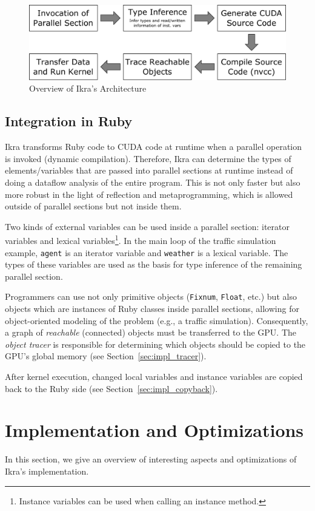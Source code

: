 \documentclass[preprint]{sigplanconf}
\begin{document}
\begin{figure}[!tp]
    \includegraphics[width=\columnwidth]{high_level_arch.pdf}
    \caption{Overview of Ikra's Architecture}
    \label{fig:overview_arch}
\end{figure}

\subsection{Integration in Ruby}
Ikra transforms Ruby code to CUDA code at runtime when a parallel operation is invoked (dynamic compilation). Therefore, Ikra can determine the types of elements/variables that are passed into parallel sections at runtime instead of doing a dataflow analysis of the entire program. This is not only faster but also more robust in the light of reflection and metaprogramming, which is allowed outside of parallel sections but not inside them.

Two kinds of external variables can be used inside a parallel section: iterator variables and lexical variables\footnote{Instance variables can be used when calling an instance method.}. In the main loop of the traffic simulation example, \texttt{agent} is an iterator variable and \texttt{weather} is a lexical variable. The types of these variables are used as the basis for type inference of the remaining parallel section.

Programmers can use not only primitive objects (\texttt{Fixnum}, \texttt{Float}, etc.) but also objects which are instances of Ruby classes inside parallel sections, allowing for object-oriented modeling of the problem (e.g., a traffic simulation). Consequently, a graph of \emph{reachable} (connected) objects must be transferred to the GPU. The \emph{object tracer} is responsible for determining which objects should be copied to the GPU's global memory (see Section~\ref{sec:impl_tracer}).

After kernel execution, changed local variables and instance variables are copied back to the Ruby side (see Section~\ref{sec:impl_copyback}).


\section{Implementation and Optimizations}
In this section, we give an overview of interesting aspects and optimizations of Ikra's implementation.
\end{document}
